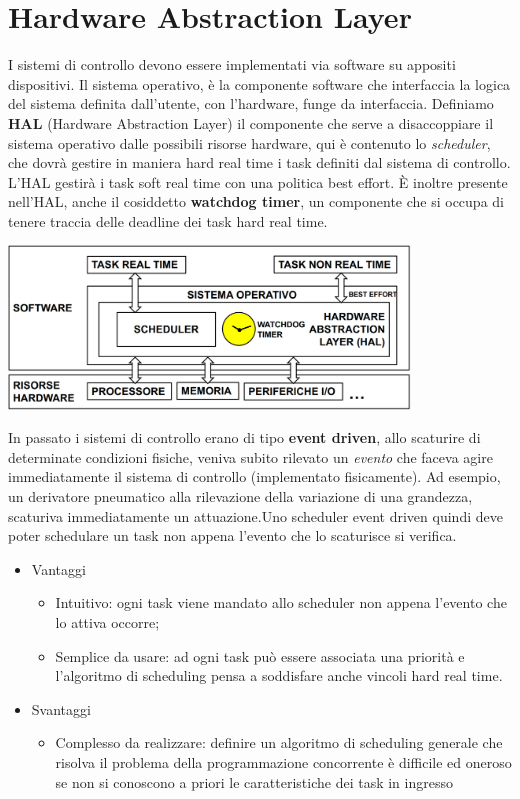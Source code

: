 \documentclass[10pt, letterpaper]{report}
\begin{document}
\section{Hardware Abstraction Layer}
I sistemi di controllo devono essere implementati via software su appositi dispositivi. Il sistema operativo, è la componente software che interfaccia la logica del sistema definita dall'utente, con l'hardware, funge da interfaccia.
Definiamo \textbf{HAL} (Hardware Abstraction
Layer) il componente che serve a disaccoppiare il sistema operativo dalle possibili risorse hardware, qui è contenuto lo \textit{scheduler}, che dovrà gestire in maniera hard real time i task definiti dal sistema di controllo. L'HAL gestirà i task soft real time con una politica best effort.\acc 
È inoltre presente nell'HAL, anche il cosiddetto \textbf{watchdog timer}, un componente che si occupa di tenere traccia delle deadline dei task hard real time.\begin{center}
    \includegraphics[width=0.8\textwidth ]{images/HAL.png}
\end{center}
In passato i sistemi di controllo erano di tipo \textbf{event driven}, allo scaturire di determinate condizioni fisiche, veniva subito rilevato un \textit{evento} che faceva agire immediatamente il sistema di controllo (implementato fisicamente). Ad esempio, un derivatore pneumatico alla rilevazione della variazione di una grandezza, scaturiva immediatamente un attuazione.\acc Uno scheduler event driven quindi deve poter schedulare un task non appena l'evento che lo scaturisce si verifica.\begin{itemize}
    \item Vantaggi\begin{itemize}
        \item Intuitivo: ogni task viene mandato allo scheduler non appena l'evento che lo attiva
        occorre;
        \item Semplice da usare: ad ogni task può essere associata una priorità e l'algoritmo
        di scheduling pensa a soddisfare anche vincoli hard real time.
    \end{itemize}
    \item Svantaggi\begin{itemize}
        \item Complesso da realizzare: definire un algoritmo di scheduling generale che
        risolva il problema della programmazione concorrente è difficile ed oneroso se non
        si conoscono a priori le caratteristiche dei task in ingresso
    \end{itemize}
\end{itemize}
\end{document}
